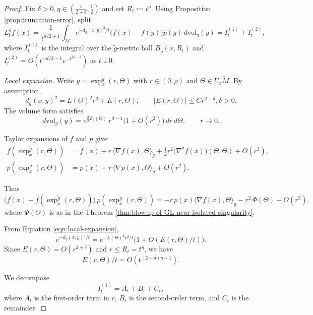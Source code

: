 \documentclass{amsart}
\theoremstyle{definition}
\theoremstyle{remark}
\newcommand{\nd}{\noindent}
\newcommand{\0}{\boldsymbol{0}}
\begin{document}
\begin{proof}
Fix $\delta > 0, \eta\in(\frac{1}{2+\delta},\frac{1}{2})$ and set $R_t:=t^{\eta}$. Using Proposition \ref{prop:truncation-error}, split
\[
L_t^g f(x)
=\frac{1}{t^{d/2+1}}\!\int_{M} e^{-d_g(x,y)^2/t}\bigl(f(x)-f(y)\bigr)p(y)\,d\mathrm{vol}_g(y)
=I_t^{(1)}+I_t^{(2)},
\]
where $I_t^{(1)}$ is the integral over the $\tilde g$-metric ball $B_{\widetilde g}(x,R_t)$ and $I_t^{(2)}=O(t^{-d/2-1}e^{-t^{2 \eta -1}})$ as $t \downarrow 0$.

\medskip\noindent
\textit{Local expansion.}  
Write $y=\exp_x^{\widetilde g}(r,\Theta)$ with $r\in(0,\rho)$ and $\Theta\in U_x\widetilde M$.  
By assumption,
\begin{equation}\label{eqn:local-expansion}
d_g(x,y)^2 = L(\Theta)^2 r^2 + E(r,\Theta), \qquad |E(r,\Theta)|\le Cr^{2+\delta}, \delta > 0.
\end{equation}
The volume form satisfies
\begin{equation}\label{eqn:loc-expansion-vol-form}
d\mathrm{vol}_g(y)
= e^{\frac d2\Psi_1(\Theta)}\,r^{d-1}\bigl(1+O(r^2)\bigr)\,dr\,d\Theta,
\qquad r\to0.                                         
\end{equation}

\nd Taylor expansions of $f$ and $p$ give
\begin{align}
f(\exp_x^{\widetilde g}(r,\Theta))
&= f(x) + r\,\langle \nabla f(x),\Theta\rangle_{\widetilde g}
 + \tfrac12 r^2 \bigl(\nabla^2 f(x)\bigr)(\Theta,\Theta) + O(r^3),\\
p(\exp_x^{\widetilde g}(r,\Theta))
&= p(x) + r\,\langle \nabla p(x),\Theta\rangle_{\widetilde g} + O(r^2).          
\end{align}

\nd Thus
\begin{equation}
\bigl(f(x)-f(\exp_x^{\widetilde g}(r,\Theta))\bigr)\,
p(\exp_x^{\widetilde g}(r,\Theta))
= - r\,p(x)\langle \nabla f(x),\Theta\rangle_{\widetilde g}
  - r^2\,\Phi(\Theta)
  + O(r^3),
\end{equation}
where $\Phi(\Theta)$ is as in the Theorem \ref{thm:blowup of GL near isolated singularity}.

\nd From Equation \ref{eqn:local-expansion},
\[
e^{-d_g(x,y)^2/t}
= e^{-L(\Theta)^2 r^2/t}\bigl(1+O(E(r,\Theta)/t)\bigr).
\]
Since $E(r,\Theta)=O(r^{2+\delta})$ and $r\le R_t=t^\eta$, we have
\[
E(r,\Theta)/t = O(t^{(2+\delta)\eta-1}).
\] 

\nd We decompose
\[
I_t^{(1)} = A_t+B_t+C_t,
\]
where $A_t$ is the first-order term in $r$, $B_t$ is the second-order term, and $C_t$ is the remainder.


\end{proof}
\end{document}
